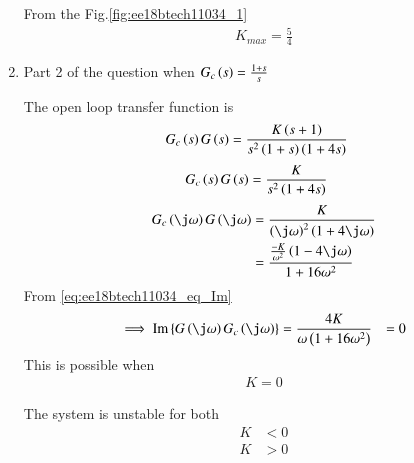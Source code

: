 \begin{enumerate}[label=\thesubsection.\arabic*.,ref=\thesubsection.\theenumi]
From the Fig.\ref{fig:ee18btech11034_1}  
\begin{align}
 K_{max} = \frac{5}{4}  
\end{align}


\solution
\item Part 2 of the question when $G_{c}\left(s\right) = \frac{1+s}{s}$

The open loop transfer function is 
\begin{align}
    G_{c}\left(s\right)G\left(s\right) &= \frac{K\left(s+1\right)}{s^2\left(1+s\right)\left(1+4s\right)}
\end{align}
\begin{align}
    G_{c}\left(s\right)G\left(s\right) &= \frac{K}{s^2\left(1+4s\right)}
\end{align}
\begin{align}
    G_{c}\brak{\j\omega}G\brak{\j\omega} &= \frac{K}{\brak{\j\omega}^2\brak{1+4\j\omega}}
    \\
    &= \frac{\frac{-K}{\omega^2}\brak{1-4\j\omega}}{1+16\omega^2}
\end{align}
From \eqref{eq:ee18btech11034_eq_Im}
\begin{align}
    \implies \text{Im} \cbrak{G\brak{\j \omega}G_{c}\brak{\j\omega}} &= \frac{4K}{{\omega}\brak{1+16\omega^2}} &= 0
\end{align}
This is possible when 
\begin{align}
    K = 0
    \label{eq:ee18btech11034_3}
\end{align}

The system is unstable for both 
\begin{align}
    K &< 0
\end{align}
\begin{align}
    K &> 0
\end{align}


\end{enumerate}

